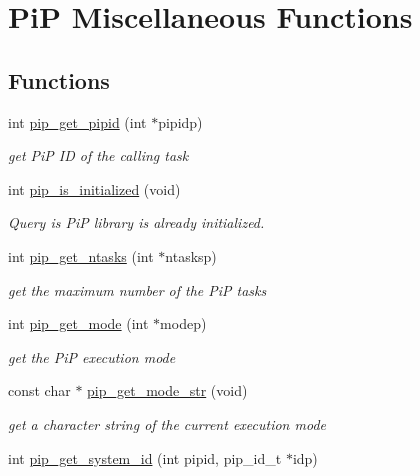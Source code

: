 \hypertarget{group__pip-5-misc}{\section{Pi\-P Miscellaneous Functions}
\label{group__pip-5-misc}
}
\subsection*{Functions}
\begin{DoxyCompactItemize}
\item 
int \hyperlink{group__pip-5-misc_ga4e715bb8c325e9acc81af0745908dc0e}{pip\-\_\-get\-\_\-pipid} (int $\ast$pipidp)
\begin{DoxyCompactList}\small\item\em get Pi\-P I\-D of the calling task \end{DoxyCompactList}\item 
int \hyperlink{group__pip-5-misc_gabbec4ae2f820b13400f63cba55a53399}{pip\-\_\-is\-\_\-initialized} (void)
\begin{DoxyCompactList}\small\item\em Query is Pi\-P library is already initialized. \end{DoxyCompactList}\item 
int \hyperlink{group__pip-5-misc_ga9786d5aafa2a3882714c35ecc9f39a5a}{pip\-\_\-get\-\_\-ntasks} (int $\ast$ntasksp)
\begin{DoxyCompactList}\small\item\em get the maximum number of the Pi\-P tasks \end{DoxyCompactList}\item 
int \hyperlink{group__pip-5-misc_gab603f68c1ce972a5f3bfb8c95fcfb555}{pip\-\_\-get\-\_\-mode} (int $\ast$modep)
\begin{DoxyCompactList}\small\item\em get the Pi\-P execution mode \end{DoxyCompactList}\item 
const char $\ast$ \hyperlink{group__pip-5-misc_ga0e12c95fe7abc5c356acfd45a89ad5d8}{pip\-\_\-get\-\_\-mode\-\_\-str} (void)
\begin{DoxyCompactList}\small\item\em get a character string of the current execution mode \end{DoxyCompactList}\item 
int \hyperlink{group__pip-5-misc_gadf3d9e96b46d7a58bf4ce6dda173091a}{pip\-\_\-get\-\_\-system\-\_\-id} (int pipid, pip\-\_\-id\-\_\-t $\ast$idp)

\end{DoxyCompactItemize}
